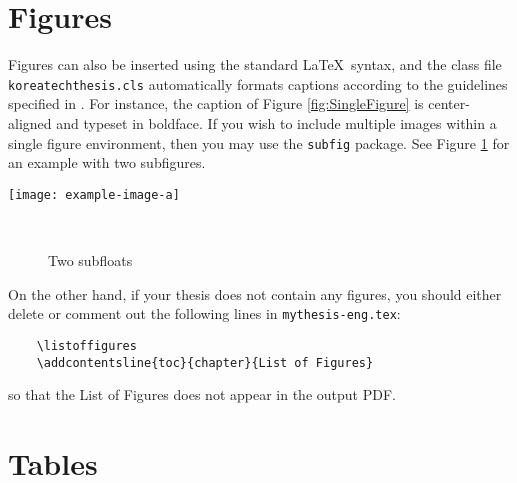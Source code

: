 \section{Figures}	\label{sec:Figures}

Figures can also be inserted using the standard \LaTeX~syntax, and the class file \verb|koreatechthesis.cls| automatically formats captions according to the guidelines specified in \cite{ThesisGuide}.
For instance, the caption of Figure \ref{fig:SingleFigure} is center-aligned and typeset in boldface.
If you wish to include multiple images within a single figure environment, then you may use the \verb|subfig| package.
See Figure \ref{fig:Subfigure} for an example with two subfigures.

\begin{figure*}[b]
	\centering%
	\texttt{[image: example-image-a]}
	\caption{An example of inserting a figure}
	\label{fig:SingleFigure}
\end{figure*}

\begin{figure}[ht]%
	\centering%
	\quad
	\\
	\caption{Two subfloats}
	\label{fig:Subfigure}
\end{figure}

On the other hand, if your thesis does not contain any figures, you should either delete or comment out the following lines in \verb|mythesis-eng.tex|:
\begin{verbatim}
	\listoffigures
	\addcontentsline{toc}{chapter}{List of Figures}
\end{verbatim}
so that the List of Figures does not appear in the output PDF.



\section{Tables}	\label{sec:Tables}


